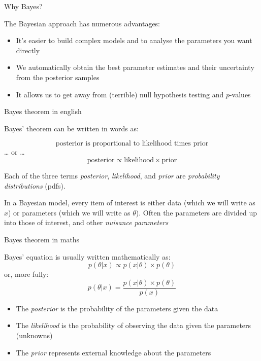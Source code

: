 \documentclass[ignorenonframetext,]{beamer}
\providecommand{\tightlist}{%
  \setlength{\itemsep}{0pt}\setlength{\parskip}{0pt}}
\begin{document}
\begin{frame}{Why Bayes?}

The Bayesian approach has numerous advantages:

\begin{itemize}
\tightlist
\item
  It's easier to build complex models and to analyse the parameters you
  want directly
\item
  We automatically obtain the best parameter estimates and their
  uncertainty from the posterior samples
\item
  It allows us to get away from (terrible) null hypothesis testing and
  \(p\)-values
\end{itemize}

\end{frame}

\begin{frame}{Bayes theorem in english}

Bayes' theorem can be written in words as:

\[\mbox{posterior is proportional to likelihood times prior}\] \ldots{}
or \ldots{}
\[\mbox{posterior} \propto \mbox{likelihood} \times \mbox{prior}\]

Each of the three terms \emph{posterior}, \emph{likelihood}, and
\emph{prior} are \emph{probability distributions} (pdfs).

In a Bayesian model, every item of interest is either data (which we
will write as \(x\)) or parameters (which we will write as \(\theta\)).
Often the parameters are divided up into those of interest, and other
\emph{nuisance parameters}

\end{frame}

\begin{frame}{Bayes theorem in maths}

Bayes' equation is usually written mathematically as:
\[p(\theta|x) \propto p(x|\theta) \times p(\theta)\] or, more fully:
\[p(\theta|x) = \frac{p(x|\theta) \times p(\theta)}{p(x)}\]

\begin{itemize}
\tightlist
\item
  The \emph{posterior} is the probability of the parameters given the
  data
\item
  The \emph{likelihood} is the probability of observing the data given
  the parameters (unknowns)
\item
  The \emph{prior} represents external knowledge about the parameters
\end{itemize}

\end{frame}
\end{document}
